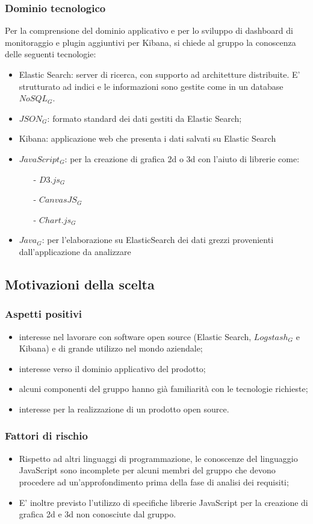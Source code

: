 		\subsubsection{Dominio tecnologico}
		Per la comprensione del dominio applicativo e per lo sviluppo di dashboard di monitoraggio e plugin aggiuntivi per Kibana, si chiede al gruppo la conoscenza delle seguenti tecnologie:
		\begin{itemize}
			\item Elastic Search: server di ricerca, con supporto ad architetture distribuite. E' strutturato ad indici e le informazioni sono gestite come in un database $NoSQL_G$.
			\item $JSON_G$: formato standard dei dati gestiti da Elastic Search;
			\item Kibana: applicazione web che presenta i dati salvati su Elastic Search
			\item $JavaScript_G$: per la creazione di grafica 2d o 3d con l'aiuto di librerie come:
			\begin{itemize}
				\item[-] $D3.js_G$
				\item[-] $CanvasJS_G$
				\item[-] $Chart.js_G$
			\end{itemize}
			\item $Java_G$: per l'elaborazione su ElasticSearch dei dati grezzi provenienti dall'applicazione da analizzare
		\end{itemize}
	\subsection{Motivazioni della scelta}
		\subsubsection{Aspetti positivi}
			\begin{itemize}
				\item interesse nel lavorare con software open source (Elastic Search, $Logstash_G$ e Kibana) e di grande utilizzo nel mondo aziendale;
				\item interesse verso il dominio applicativo del prodotto;
				\item alcuni componenti del gruppo hanno già familiarità con le tecnologie richieste;
				\item interesse per la realizzazione di un prodotto open source.
			\end{itemize}
		\subsubsection{Fattori di rischio}
			\begin{itemize}
				\item Rispetto ad altri linguaggi di programmazione, le conoscenze del linguaggio JavaScript sono incomplete per alcuni membri del gruppo che devono procedere ad un'approfondimento prima della fase di analisi dei requisiti;
				\item E' inoltre previsto l'utilizzo di specifiche librerie JavaScript per la creazione di grafica 2d e 3d non conosciute dal gruppo.
			\end{itemize}
